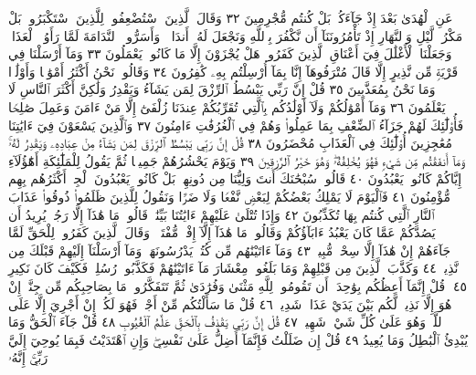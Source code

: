 عَنِ ٱلْهُدَىٰ بَعْدَ إِذْ جَآءَكُمۖ بَلْ كُنتُم مُّجْرِمِينَ ٣٢ وَقَالَ ٱلَّذِينَ
ٱسْتُضْعِفُوا۟ لِلَّذِينَ ٱسْتَكْبَرُوا۟ بَلْ مَكْرُ ٱلَّيْلِ وَٱلنَّهَارِ إِذْ
تَأْمُرُونَنَآ أَن نَّكْفُرَ بِٱللَّهِ وَنَجْعَلَ لَهُۥٓ أَندَادࣰاۚ وَأَسَرُّوا۟ ٱلنَّدَامَةَ
لَمَّا رَأَوُا۟ ٱلْعَذَابَۚ وَجَعَلْنَا ٱلْأَغْلَٰلَ فِيٓ أَعْنَاقِ ٱلَّذِينَ كَفَرُوا۟ۖ
هَلْ يُجْزَوْنَ إِلَّا مَا كَانُوا۟ يَعْمَلُونَ ٣٣ وَمَآ أَرْسَلْنَا فِي قَرْيَةࣲ
مِّن نَّذِيرٍ إِلَّا قَالَ مُتْرَفُوهَآ إِنَّا بِمَآ أُرْسِلْتُم بِهِۦ كَٰفِرُونَ ٣٤
وَقَالُوا۟ نَحْنُ أَكْثَرُ أَمْوَٰلࣰا وَأَوْلَٰدࣰا وَمَا نَحْنُ بِمُعَذَّبِينَ ٣٥
قُلْ إِنَّ رَبِّي يَبْسُطُ ٱلرِّزْقَ لِمَن يَشَآءُ وَيَقْدِرُ وَلَٰكِنَّ أَكْثَرَ
ٱلنَّاسِ لَا يَعْلَمُونَ ٣٦ وَمَآ أَمْوَٰلُكُمْ وَلَآ أَوْلَٰدُكُم بِٱلَّتِي تُقَرِّبُكُمْ
عِندَنَا زُلْفَىٰٓ إِلَّا مَنْ ءَامَنَ وَعَمِلَ صَٰلِحࣰا فَأُو۟لَٰٓئِكَ لَهُمْ جَزَآءُ
ٱلضِّعْفِ بِمَا عَمِلُوا۟ وَهُمْ فِي ٱلْغُرُفَٰتِ ءَامِنُونَ ٣٧ وَٱلَّذِينَ
يَسْعَوْنَ فِيٓ ءَايَٰتِنَا مُعَٰجِزِينَ أُو۟لَٰٓئِكَ فِي ٱلْعَذَابِ مُحْضَرُونَ ٣٨
قُلْ إِنَّ رَبِّي يَبْسُطُ ٱلرِّزْقَ لِمَن يَشَآءُ مِنْ عِبَادِهِۦ وَيَقْدِرُ لَهُۥۚ
وَمَآ أَنفَقْتُم مِّن شَيْءࣲ فَهُوَ يُخْلِفُهُۥۖ وَهُوَ خَيْرُ ٱلرَّٰزِقِينَ ٣٩
وَيَوْمَ يَحْشُرُهُمْ جَمِيعࣰا ثُمَّ يَقُولُ لِلْمَلَٰٓئِكَةِ أَهَٰٓؤُلَآءِ إِيَّاكُمْ كَانُوا۟
يَعْبُدُونَ ٤٠ قَالُوا۟ سُبْحَٰنَكَ أَنتَ وَلِيُّنَا مِن دُونِهِمۖ بَلْ كَانُوا۟
يَعْبُدُونَ ٱلْجِنَّۖ أَكْثَرُهُم بِهِم مُّؤْمِنُونَ ٤١ فَٱلْيَوْمَ لَا يَمْلِكُ
بَعْضُكُمْ لِبَعْضࣲ نَّفْعࣰا وَلَا ضَرࣰّا وَنَقُولُ لِلَّذِينَ ظَلَمُوا۟ ذُوقُوا۟ عَذَابَ
ٱلنَّارِ ٱلَّتِي كُنتُم بِهَا تُكَذِّبُونَ ٤٢ وَإِذَا تُتْلَىٰ عَلَيْهِمْ ءَايَٰتُنَا بَيِّنَٰتࣲ
قَالُوا۟ مَا هَٰذَآ إِلَّا رَجُلࣱ يُرِيدُ أَن يَصُدَّكُمْ عَمَّا كَانَ يَعْبُدُ ءَابَآؤُكُمْ
وَقَالُوا۟ مَا هَٰذَآ إِلَّآ إِفْكࣱ مُّفْتَرࣰىۚ وَقَالَ ٱلَّذِينَ كَفَرُوا۟ لِلْحَقِّ لَمَّا
جَآءَهُمْ إِنْ هَٰذَآ إِلَّا سِحْرࣱ مُّبِينࣱ ٤٣ وَمَآ ءَاتَيْنَٰهُم مِّن كُتُبࣲ
يَدْرُسُونَهَاۖ وَمَآ أَرْسَلْنَآ إِلَيْهِمْ قَبْلَكَ مِن نَّذِيرࣲ ٤٤ وَكَذَّبَ
ٱلَّذِينَ مِن قَبْلِهِمْ وَمَا بَلَغُوا۟ مِعْشَارَ مَآ ءَاتَيْنَٰهُمْ فَكَذَّبُوا۟
رُسُلِيۖ فَكَيْفَ كَانَ نَكِيرِ ٤٥۞ قُلْ إِنَّمَآ أَعِظُكُم بِوَٰحِدَةٍۖ أَن
تَقُومُوا۟ لِلَّهِ مَثْنَىٰ وَفُرَٰدَىٰ ثُمَّ تَتَفَكَّرُوا۟ۚ مَا بِصَاحِبِكُم مِّن
جِنَّةٍۚ إِنْ هُوَ إِلَّا نَذِيرࣱ لَّكُم بَيْنَ يَدَيْ عَذَابࣲ شَدِيدࣲ ٤٦ قُلْ
مَا سَأَلْتُكُم مِّنْ أَجْرࣲ فَهُوَ لَكُمْۖ إِنْ أَجْرِيَ إِلَّا عَلَى ٱللَّهِۖ وَهُوَ عَلَىٰ
كُلِّ شَيْءࣲ شَهِيدࣱ ٤٧ قُلْ إِنَّ رَبِّي يَقْذِفُ بِٱلْحَقِّ عَلَّٰمُ ٱلْغُيُوبِ ٤٨
قُلْ جَآءَ ٱلْحَقُّ وَمَا يُبْدِئُ ٱلْبَٰطِلُ وَمَا يُعِيدُ ٤٩ قُلْ إِن ضَلَلْتُ
فَإِنَّمَآ أَضِلُّ عَلَىٰ نَفْسِيۖ وَإِنِ ٱهْتَدَيْتُ فَبِمَا يُوحِيٓ إِلَيَّ رَبِّيٓۚ إِنَّهُۥ
